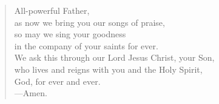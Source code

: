 \prayer

\setlength{\vleftmargin}{\prayerleftmargini}

\begin{verse}
All-powerful Father,\\
as now we bring you our songs of praise,\\
so may we sing your goodness\\
in the company of your saints for ever.\\
We ask this through our Lord Jesus Christ, your Son,\\
who lives and reigns with you and the Holy Spirit,\\
God, for ever and ever.\\
{\color{red}---\thinspace}Amen.
\end{verse}

\setlength{\vleftmargin}{\defleftmargini}